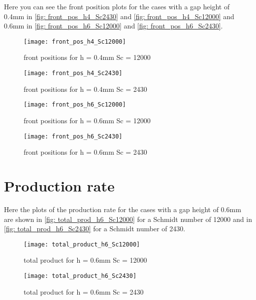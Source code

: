 \documentclass[../thesis.tex]{subfiles}
\begin{document}
Here you can see the front position plots for the cases with a gap height of 0.4mm in \autoref{fig: front_pos_h4_Sc2430} and \autoref{fig: front_pos_h4_Sc12000} and 0.6mm in \autoref{fig: front_pos_h6_Sc12000} and \autoref{fig: front_pos_h6_Sc2430}.
\begin{figure}[htbp]
	\centering
	\texttt{[image: front\_pos\_h4\_Sc12000]}
	\caption{front positions for h = 0.4mm Sc = 12000
	\label{fig: front_pos_h4_Sc12000}}
\end{figure}
\begin{figure}[htbp]
	\centering
	\texttt{[image: front\_pos\_h4\_Sc2430]}
	\caption{front positions for h = 0.4mm Sc = 2430
	\label{fig: front_pos_h4_Sc2430}}
\end{figure}
\begin{figure}[htbp]
	\centering
	\texttt{[image: front\_pos\_h6\_Sc12000]}
	\caption{front positions for h = 0.6mm Sc = 12000
	\label{fig: front_pos_h6_Sc12000}}
\end{figure}
\begin{figure}[htb]
	\centering
	\texttt{[image: front\_pos\_h6\_Sc2430]}
	\caption{front positions for h = 0.6mm Sc = 2430
	\label{fig: front_pos_h6_Sc2430}}
\end{figure}
\section{Production rate}
Here the plots of the production rate for the cases with a gap height of 0.6mm are shown in \autoref{fig: total_prod_h6_Sc12000} for a Schmidt number of 12000 and in \autoref{fig: total_prod_h6_Sc2430} for a Schmidt number of 2430.
\begin{figure}[htb]
	\centering
	\texttt{[image: total\_product\_h6\_Sc12000]}
	\caption{total product for  h = 0.6mm Sc = 12000
	\label{fig: total_prod_h6_Sc12000}}
\end{figure}
\begin{figure}[htb]
	\centering
	\texttt{[image: total\_product\_h6\_Sc2430]}
	\caption{total product for  h = 0.6mm Sc = 2430
	\label{fig: total_prod_h6_Sc2430}}
\end{figure}
\end{document}
